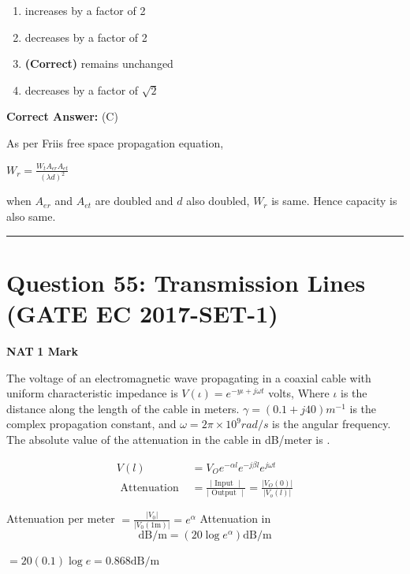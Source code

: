 \documentclass[11pt,a4paper]{article}
\begin{document}
\begin{enumerate}[label=(\Alph*)]
    \item increases by a factor of 2
    \item decreases by a factor of 2
    \item \textbf{(Correct)} remains unchanged
    \item decreases by a factor of $\sqrt{2}$
\end{enumerate}

\noindent \textbf{Correct Answer:} (C)

\begin{tcolorbox}[solbox, title=Detailed Solution -- Question 54]
As per Friis free space propagation equation,

$W_{r}=\frac{W_{t} A_{e r} A_{e t}}{(\lambda d)^{2}}$

when $A_{e r}$ and $A_{e t}$ are doubled and $d$ also doubled, $W_{r}$ is same. Hence capacity is also same.
\end{tcolorbox}

\vspace{1.5em}
\hrule
\vspace{1.5em}

\section*{Question 55: Transmission Lines (GATE EC 2017-SET-1)}
\noindent \textbf{\color{primary}NAT} \hfill \textbf{\color{secondary}1 Mark}


\noindent The voltage of an electromagnetic wave propagating in a coaxial cable with uniform characteristic impedance is $V(\iota )=e^{-y \iota +j\omega t}$ volts, Where $\iota$ is the distance along the length of the cable in meters.  $\gamma =(0.1+j40)m^{-1}$ is the complex propagation constant, and $\omega = 2\pi \times 10^{9} rad/ s$  is the angular frequency. The absolute value of the attenuation in the cable in dB/meter is \underline{\hspace{1.5cm}}.


\begin{tcolorbox}[solbox, title=Detailed Solution -- Question 55]
\[
\begin{aligned} V(l) &=V_{O} e^{-\alpha l} e^{-j\beta l} e^{j\omega t} \\ \text { Attenuation } &=\frac{\mid \text { Input } \mid}{\mid \text { Output } \mid}=\frac{\left|V_{O}(0)\right|}{\left|V_{o}(l)\right|} \end{aligned}
\]

 Attenuation per meter $=\frac{\left|V_{0}\right|}{\left|V_{0}(1 \mathrm{m})\right|}=e^{\alpha}$
 Attenuation in 
\[
\mathrm{dB} / \mathrm{m}=\left(20 \log e^{\alpha}\right) \mathrm{dB} / \mathrm{m}
\]

$=20(0.1) \log e=0.868 \mathrm{dB} / \mathrm{m}$
\end{tcolorbox}
\end{document}
